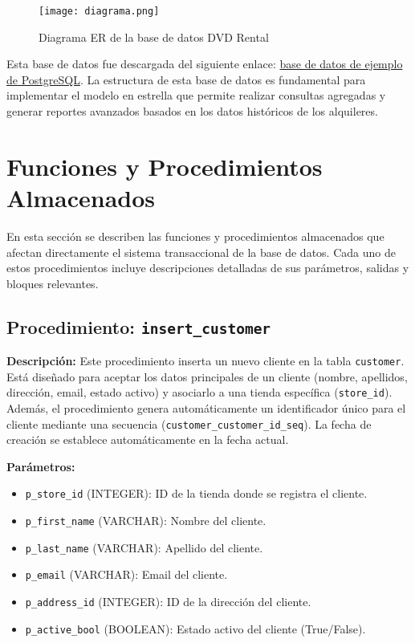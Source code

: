 \documentclass{article}
\begin{document}
\begin{figure}[h]
    \centering
    \texttt{[image: diagrama.png]}
    \caption{Diagrama ER de la base de datos DVD Rental}
    \label{fig:diagrama-er}
\end{figure}

Esta base de datos fue descargada del siguiente enlace: \href{https://www.postgresqltutorial.com/postgresql-getting-started/postgresql-sample-database/}{base de datos de ejemplo de PostgreSQL}. La estructura de esta base de datos es fundamental para implementar el modelo en estrella que permite realizar consultas agregadas y generar reportes avanzados basados en los datos históricos de los alquileres.

\newpage
\section{Funciones y Procedimientos Almacenados}

En esta sección se describen las funciones y procedimientos almacenados que afectan directamente el sistema transaccional de la base de datos. Cada uno de estos procedimientos incluye descripciones detalladas de sus parámetros, salidas y bloques relevantes.

\subsection{Procedimiento: \texttt{insert\_customer}}

\textbf{Descripción:}  
Este procedimiento inserta un nuevo cliente en la tabla \texttt{customer}. Está diseñado para aceptar los datos principales de un cliente (nombre, apellidos, dirección, email, estado activo) y asociarlo a una tienda específica (\texttt{store\_id}). Además, el procedimiento genera automáticamente un identificador único para el cliente mediante una secuencia (\texttt{customer\_customer\_id\_seq}). La fecha de creación se establece automáticamente en la fecha actual.

\textbf{Parámetros:}
\begin{itemize}
    \item \texttt{p\_store\_id} (INTEGER): ID de la tienda donde se registra el cliente.
    \item \texttt{p\_first\_name} (VARCHAR): Nombre del cliente.
    \item \texttt{p\_last\_name} (VARCHAR): Apellido del cliente.
    \item \texttt{p\_email} (VARCHAR): Email del cliente.
    \item \texttt{p\_address\_id} (INTEGER): ID de la dirección del cliente.
    \item \texttt{p\_active\_bool} (BOOLEAN): Estado activo del cliente (True/False).
\end{itemize}
\end{document}
